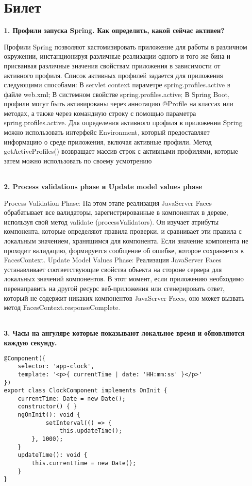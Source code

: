 \documentclass{article}
\newcommand{\bil}[5]{%
        \section{Билет}
        \textbf{1. #1}

        #4
        \\
        \textbf{2. #2}
        
        #5
        \\
        \textbf{3. #3}
}
\begin{document}
\bil{Профили запуска Spring. Как определить, какой сейчас активен?}
{Process validations phase и Update model values phase}
{Часы на ангуляре которые показывают локальное время и обновляются каждую секунду.}{
    Профили Spring позволяют кастомизировать приложение для работы в различном окружении, инстанционируя различные реализации одного и того же бина и присваивая различные значения свойствам приложения в зависимости от активного профиля.
    Список активных профилей задается для приложения следующими способами: В servlet context параметре spring.profiles.active в файле web.xml; В системном свойстве spring.profiles.active;
    В Spring Boot, профили могут быть активированы через аннотацию @Profile на классах или методах, а также через командную строку с помощью параметра spring.profiles.active.
    Для определения активного профиля в приложении Spring можно использовать интерфейс Environment, который предоставляет информацию о среде приложения, включая активные профили. Метод getActiveProfiles() возвращает массив строк с активными профилями, которые затем можно использовать по своему усмотрению
}{
    Process Validation Phase: На этом этапе реализация JavaServer Faces обрабатывает все валидаторы, зарегистрированные в компонентах в дереве, используя свой метод validate (processValidators). 
    Он изучает атрибуты компонента, которые определяют правила проверки, и сравнивает эти правила с локальным значением, хранящимся для компонента. 
    Если значение компонента не проходит валидацию, формируется сообщение об ошибке, которое сохраняется в FacesContext. 
    Update Model Values Phase: Реализация JavaServer Faces устанавливает соответствующие свойства объекта на стороне сервера для локальных значений компонентов. 
    В этот момент, если приложению необходимо перенаправить на другой ресурс веб-приложения или сгенерировать ответ, который не содержит никаких компонентов JavaServer Faces, оно может вызвать метод FacesContext.responseComplete.
}
\begin{lstlisting}[frame=single, basicstyle=\ttfamily, breaklines=true, breakatwhitespace=true, postbreak=\mbox{\textcolor{red}{$\hookrightarrow$}\space}]
@Component({
    selector: 'app-clock',
    template: '<p>{ currentTime | date: 'HH:mm:ss' }</p>'
})
export class ClockComponent implements OnInit {
    currentTime: Date = new Date();
    constructor() { }
    ngOnInit(): void {
            setInterval(() => {
                this.updateTime();
        }, 1000);
    }
    updateTime(): void {
        this.currentTime = new Date();
    }
}
\end{lstlisting}
\end{document}
